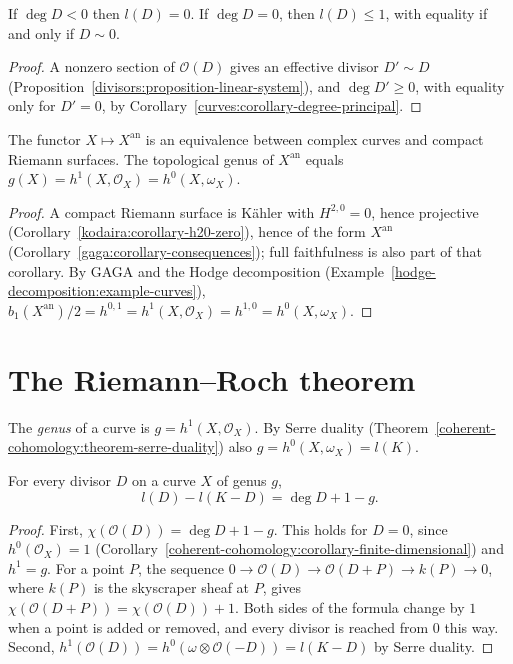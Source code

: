 \begin{lemma}\label{curves:lemma-negative-degree}
If $\deg D < 0$ then $l(D) = 0$. If $\deg D = 0$, then $l(D) \leq 1$, with equality if and only if $D \sim 0$.
\end{lemma}

\begin{proof}
A nonzero section of $\mathcal{O}(D)$ gives an effective divisor $D' \sim D$ (Proposition~\ref{divisors:proposition-linear-system}), and $\deg D' \geq 0$, with equality only
for $D' = 0$, by Corollary~\ref{curves:corollary-degree-principal}.
\end{proof}

\begin{theorem}\label{curves:theorem-riemann-surfaces}
The functor $X \mapsto X^{\mathrm{an}}$ is an equivalence between complex curves and compact Riemann surfaces. The topological genus of $X^{\mathrm{an}}$ equals
$g(X) = h^1(X, \mathcal{O}_X) = h^0(X, \omega_X)$.
\end{theorem}

\begin{proof}
A compact Riemann surface is K\"ahler with $H^{2,0} = 0$, hence projective (Corollary~\ref{kodaira:corollary-h20-zero}), hence of the form $X^{\mathrm{an}}$
(Corollary~\ref{gaga:corollary-consequences}); full faithfulness is also part of that corollary. By GAGA and the Hodge decomposition
(Example~\ref{hodge-decomposition:example-curves}), $b_1(X^{\mathrm{an}})/2 = h^{0,1} = h^1(X, \mathcal{O}_X) = h^{1,0} = h^0(X, \omega_X)$.
\end{proof}

\section{The Riemann--Roch theorem}\label{curves:section-riemann-roch}

\begin{definition}\label{curves:definition-genus}
The \emph{genus} of a curve is $g = h^1(X, \mathcal{O}_X)$. By Serre duality (Theorem~\ref{coherent-cohomology:theorem-serre-duality}) also $g = h^0(X, \omega_X) = l(K)$.
\end{definition}

\begin{theorem}\label{curves:theorem-riemann-roch}
For every divisor $D$ on a curve $X$ of genus $g$,
\[
l(D) - l(K - D) = \deg D + 1 - g .
\]
\end{theorem}

\begin{proof}
First, $\chi(\mathcal{O}(D)) = \deg D + 1 - g$. This holds for $D = 0$, since $h^0(\mathcal{O}_X) = 1$ (Corollary~\ref{coherent-cohomology:corollary-finite-dimensional}) and
$h^1 = g$. For a point $P$, the sequence $0 \to \mathcal{O}(D) \to \mathcal{O}(D + P) \to k(P) \to 0$, where $k(P)$ is the skyscraper sheaf at $P$, gives
$\chi(\mathcal{O}(D + P)) = \chi(\mathcal{O}(D)) + 1$. Both sides of the formula change by $1$ when a point is added or removed, and every divisor is reached from $0$ this way. Second,
$h^1(\mathcal{O}(D)) = h^0(\omega \otimes \mathcal{O}(-D)) = l(K - D)$ by Serre duality.
\end{proof}

